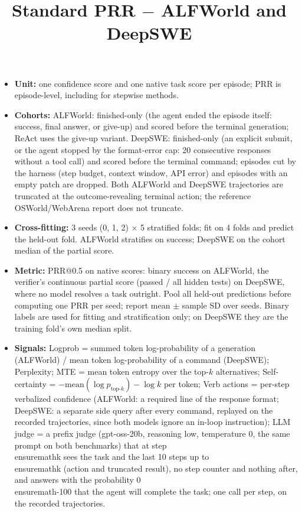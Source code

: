 \documentclass[10pt,a4paper]{article}
\title{Standard PRR \ensuremath{-} ALFWorld and DeepSWE}
\author{}
\date{}
\begin{document}
\maketitle
\vspace{-8mm}
\begin{itemize}
\item \textbf{Unit:} one confidence score and one native task score per episode; PRR is episode-level, including for stepwise methods.
\item \textbf{Cohorts:} ALFWorld: finished-only (the agent ended the episode itself: success, final answer, or give-up) and scored before the terminal generation; ReAct uses the give-up variant. DeepSWE: finished-only (an explicit submit, or the agent stopped by the format-error cap: 20 consecutive responses without a tool call) and scored before the terminal command; episodes cut by the harness (step budget, context window, API error) and episodes with an empty patch are dropped. Both ALFWorld and DeepSWE trajectories are truncated at the outcome-revealing terminal action; the reference OSWorld/WebArena report does not truncate.
\item \textbf{Cross-fitting:} 3 seeds (0, 1, 2) \ensuremath{\times} 5 stratified folds; fit on 4 folds and predict the held-out fold. ALFWorld stratifies on success; DeepSWE on the cohort median of the partial score.
\item \textbf{Metric:} PRR@0.5 on native scores: binary success on ALFWorld, the verifier's continuous partial score (passed / all hidden tests) on DeepSWE, where no model resolves a task outright. Pool all held-out predictions before computing one PRR per seed; report mean \ensuremath{\pm} sample SD over seeds. Binary labels are used for fitting and stratification only; on DeepSWE they are the training fold's own median split.
\item \textbf{Signals:} Logprob = summed token log-probability of a generation (ALFWorld) / mean token log-probability of a command (DeepSWE); Perplexity; MTE = mean token entropy over the top-\ensuremath{k} alternatives; Self-certainty = \ensuremath{-\mathrm{mean}(\log p_{\mathrm{top}\text{-}k}) - \log k} per token; Verb actions = per-step verbalized confidence (ALFWorld: a required line of the response format; DeepSWE: a separate side query after every command, replayed on the recorded trajectories, since both models ignore an in-loop instruction); LLM judge = a prefix judge (gpt-oss-20b, reasoning low, temperature 0, the same prompt on both benchmarks) that at step \\ensuremath{k} sees the task and the last 10 steps up to \\ensuremath{k} (action and truncated result), no step counter and nothing after, and answers with the probability 0\\ensuremath{-}100 that the agent will complete the task; one call per step, on the recorded trajectories.

\end{itemize}
\end{document}
